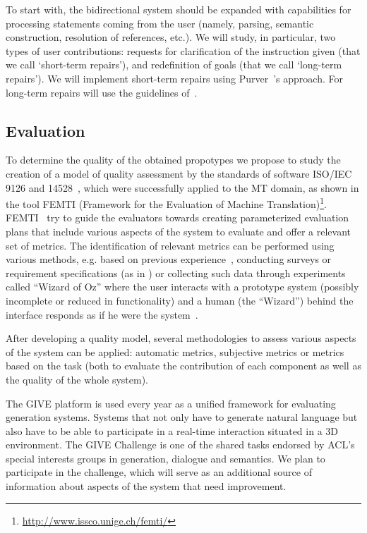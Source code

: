 To start with, the bidirectional system should be expanded with capabilities
for  processing statements coming from the user (namely, parsing, semantic
construction, resolution of references, etc.). We will study, in particular, two
types of user contributions: requests for clarification of the instruction
given (that we call `short-term repairs'), and redefinition of goals (that we
call `long-term repairs'). We will implement short-term repairs
using Purver~'s approach. For long-term repairs will use the
guidelines of~\cite{blaylock05a}. 
\medskip

\subsection{Evaluation}
To determine the quality of the obtained propotypes we propose to study the
creation of a model of quality assessment by the standards of software ISO/IEC
9126 and 14528~\cite{ISO9126-1,ISO14598-1}, which were successfully applied to
the MT domain, as shown in the tool FEMTI (Framework for the Evaluation of
Machine Translation)\footnote{\url{http://www.issco.unige.ch/femti/}}. FEMTI~\cite{Est2005}
try to guide the evaluators towards creating parameterized evaluation
plans that include various aspects of the system to evaluate and offer a
relevant set of metrics. The identification of relevant metrics can be performed
using various methods, e.g. based on previous
experience~\cite{paradise06,Chu2000,Litman2002}, conducting
surveys or requirement specifications (as in \cite{Lecoeuche98}) or
collecting such data through experiments called ``Wizard of Oz'' where the user
interacts with a prototype system (possibly incomplete or reduced in
functionality) and a human (the ``Wizard'') behind the interface responds as if
he were the system~\cite{Dahlback93,Fabbrizio05}.

After developing a quality model, several methodologies to assess
various aspects of the system can be applied: automatic metrics,
subjective metrics or metrics based on the task (both to
evaluate the contribution of each component as well as the quality of the whole
system). 

The GIVE platform is used every year as a unified framework for evaluating
generation systems. Systems that not only have to generate natural language
but also have to be able to participate in a real-time interaction situated in a
3D environment. The GIVE Challenge is one of the shared tasks endorsed by
ACL's special interests groups in generation, dialogue and semantics. We plan
to participate in the challenge, which will serve as an additional
source of information about aspects of the system that need
improvement.


